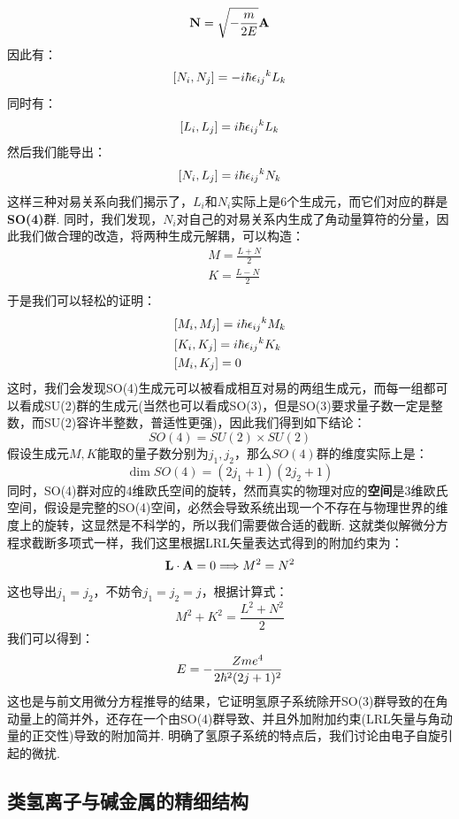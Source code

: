 \[
\mathbf{N} = \sqrt{-\frac{m}{2E}}\mathbf{A}
\]
因此有：
\[
[N_{i},N_{j}] = -i\hbar{\epsilon_{ij}}^{k}L_{k}
\]
同时有：
\[
[L_{i},L_{j}] = i\hbar{\epsilon_{ij}}^{k}L_{k}
\]
然后我们能导出：
\[
[N_{i},L_{j}] = i\hbar{\epsilon_{ij}}^{k}N_{k}
\]
这样三种对易关系向我们揭示了，\(L_{i}\)和\(N_{i}\)实际上是6个生成元，而它们对应的群是\textbf{SO(4)}群. 同时，我们发现，\(N_{i}\)对自己的对易关系内生成了角动量算符的分量，因此我们做合理的改造，将两种生成元解耦，可以构造：
\begin{align*}
& M = \frac{L+N}{2} \\
& K = \frac{L-N}{2} \\
\end{align*}
于是我们可以轻松的证明：
\begin{align*}
& [M_{i},M_{j}] = i\hbar{\epsilon_{ij}}^{k}M_{k} \\
& [K_{i},K_{j}] = i\hbar{\epsilon_{ij}}^{k}K_{k} \\
& [M_{i},K_{j}] = 0
\end{align*}
这时，我们会发现SO(4)生成元可以被看成相互对易的两组生成元，而每一组都可以看成SU(2)群的生成元(当然也可以看成SO(3)，但是SO(3)要求量子数一定是整数，而SU(2)容许半整数，普适性更强)，因此我们得到如下结论：
\[
SO(4) = SU(2)\times SU(2)
\]
假设生成元\(M,K\)能取的量子数分别为\(j_{1},j_{2}\)，那么\(SO(4)\)群的维度实际上是：
\[
\dim SO(4) = (2j_{1} + 1)(2j_{2} + 1)
\]
同时，SO(4)群对应的4维欧氏空间的旋转，然而真实的物理对应的\textbf{空间}是3维欧氏空间，假设是完整的SO(4)空间，必然会导致系统出现一个不存在与物理世界的维度上的旋转，这显然是不科学的，所以我们需要做合适的截断. 这就类似解微分方程求截断多项式一样，我们这里根据LRL矢量表达式得到的附加约束为：
\[
\mathbf{L}\cdot\mathbf{A} = 0 \Longrightarrow M^{2} = N^{2}
\]
这也导出\(j_{1}=j_{2}\)，不妨令\(j_{1}=j_{2}=j\)，根据计算式：
\[
M^{2} + K^{2} = \frac{L^{2} + N^{2}}{2}
\]
我们可以得到：
\[
E = -\frac{Zme^{4}}{2\hbar^{2}(2j+1)^{2}}
\]
这也是与前文用微分方程推导的结果，它证明氢原子系统除开SO(3)群导致的在角动量上的简并外，还存在一个由SO(4)群导致、并且外加附加约束(LRL矢量与角动量的正交性)导致的附加简并. 明确了氢原子系统的特点后，我们讨论由电子自旋引起的微扰. 
\subsection{类氢离子与碱金属的精细结构}
